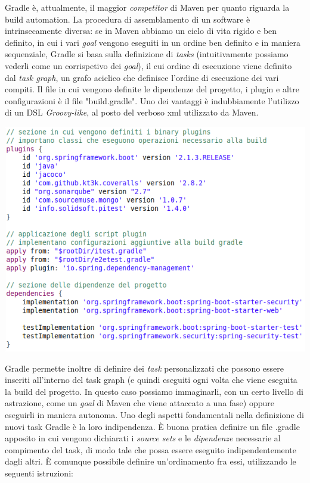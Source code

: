 Gradle è, attualmente, il maggior \textsl{competitor} di Maven per quanto riguarda la build automation.\newline
La procedura di assemblamento di un software è intrinsecamente diversa: se in Maven abbiamo un ciclo di vita rigido e ben definito, in cui i vari \textsl{goal} vengono eseguiti in un ordine ben definito e in maniera sequenziale, Gradle si basa sulla definizione di \textsl{tasks} (intuitivamente possiamo vederli come un corrispetivo dei \textsl{goal}), il cui ordine di esecuzione viene definito dal \textsl{task graph}, un grafo aciclico che definisce l'ordine di esecuzione dei vari compiti.\newline\newline
Il file in cui vengono definite le dipendenze del progetto, i plugin e altre configurazioni è il file "build.gradle". Uno dei vantaggi è indubbiamente l'utilizzo di un DSL \textsl{Groovy-like}, al posto del verboso xml utilizzato da Maven.\newline

\vspace{1cm}
\begin{minipage}{\linewidth}
	\includegraphics[width=\textwidth]{img/build-gradle.png}
\end{minipage}

\pagebreak
Gradle permette inoltre di definire dei \textsl{task} personalizzati che possono essere inseriti all'interno del task graph (e quindi eseguiti ogni volta che viene eseguita la build del progetto. In questo caso possiamo immaginarli, con un certo livello di astrazione, come un \textsl{goal} di Maven che viene attaccato a una fase) oppure eseguirli in maniera autonoma.\newline\newline
Uno degli aspetti fondamentali nella definizione di nuovi task Gradle è la loro indipendenza. È buona pratica definire un file .gradle apposito in cui vengono dichiarati i \textsl{source sets} e le \textsl{dipendenze} necessarie al compimento del task, di modo tale che possa essere eseguito indipendentemente dagli altri.
È comunque possibile definire un'ordinamento fra essi, utilizzando le seguenti istruzioni:

